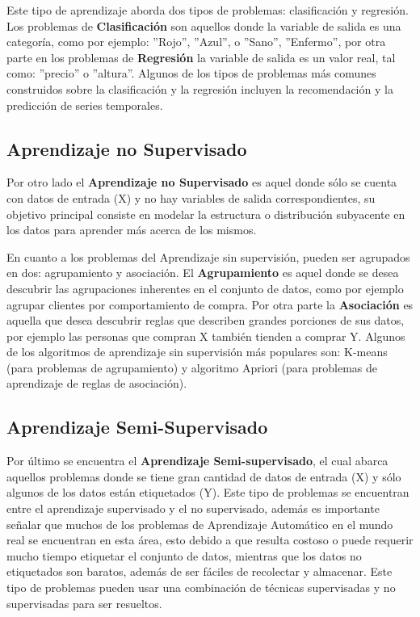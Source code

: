 \vspace{5mm} %

Este tipo de aprendizaje aborda dos tipos de problemas: clasificaci\'{o}n y regresi\'{o}n. Los problemas de \textbf{Clasificaci\'{o}n} son aquellos donde la variable de salida es una categor\'{i}a, como por ejemplo: ''Rojo'', ''Azul'', o ''Sano'', ''Enfermo'', por otra parte en los problemas de \textbf{Regresi\'{o}n} la variable de salida es un valor real, tal como: ''precio'' o ''altura''. Algunos de los tipos de problemas m\'{a}s comunes construidos sobre la clasificaci\'{o}n y la regresi\'{o}n incluyen la recomendaci\'{o}n y la predicci\'{o}n de series temporales.

\subsection{Aprendizaje no Supervisado}

Por otro lado el \textbf{Aprendizaje no Supervisado} es aquel donde s\'{o}lo se cuenta con datos de entrada (X) y no hay variables de salida correspondientes, su objetivo principal consiste en modelar la estructura o distribuci\'{o}n subyacente en los datos para aprender m\'{a}s acerca de los mismos.

\vspace{5mm} %

En cuanto a los problemas del Aprendizaje sin supervisi\'{o}n, pueden ser agrupados en dos: agrupamiento y asociaci\'{o}n. El \textbf{Agrupamiento} es aquel donde se desea descubrir las agrupaciones inherentes en el conjunto de datos, como por ejemplo agrupar clientes por comportamiento de compra. Por otra parte la \textbf{Asociaci\'{o}n} es aquella que desea descubrir reglas que describen grandes porciones de sus datos, por ejemplo las personas que compran X tambi\'{e}n tienden a comprar Y. Algunos de los algoritmos de aprendizaje sin supervisi\'{o}n m\'{a}s populares son: K-means (para problemas de agrupamiento) y algoritmo Apriori (para problemas de aprendizaje de reglas de asociaci\'{o}n).

\subsection{Aprendizaje Semi-Supervisado}

Por \'{u}ltimo se encuentra el \textbf{Aprendizaje Semi-supervisado}, el cual abarca aquellos problemas donde se tiene gran cantidad de datos de entrada (X) y s\'{o}lo algunos de los datos est\'{a}n etiquetados (Y). Este tipo de problemas se encuentran entre el aprendizaje supervisado y el no supervisado, adem\'{a}s es importante se\~{n}alar que muchos de los problemas de Aprendizaje Autom\'{a}tico en el mundo real se encuentran en esta \'{a}rea, esto debido a que resulta costoso o puede requerir mucho tiempo etiquetar el conjunto de datos, mientras que los datos no etiquetados son baratos, adem\'{a}s de ser f\'{a}ciles de recolectar y almacenar. Este tipo de problemas pueden usar una combinaci\'{o}n de t\'{e}cnicas supervisadas y no supervisadas para ser resueltos.

